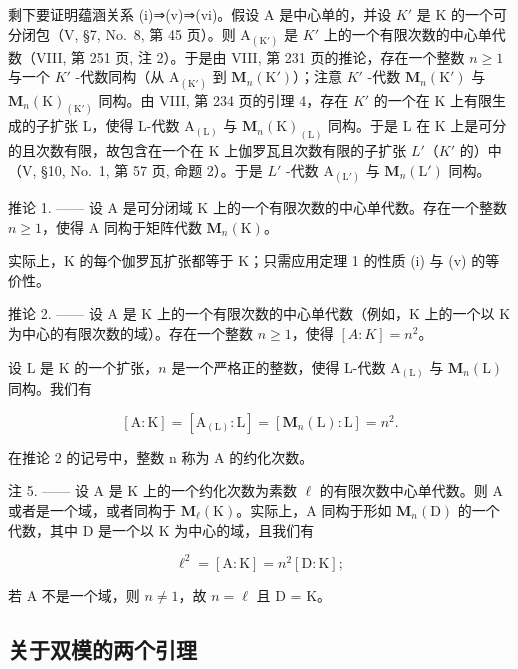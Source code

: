 剩下要证明蕴涵关系 (i)⇒(v)⇒(vi)。假设 A 是中心单的，并设 \(K'\) 是 K 的一个可分闭包（V, §7, No.~8, 第 45 页）。则 \(\mathrm{A}_{(\mathrm{K}')}\) 是 \(K'\) 上的一个有限次数的中心单代数（VIII, 第 251 页, 注 2）。于是由 VIII, 第 231 页的推论，存在一个整数 \(n \geqslant 1\) 与一个 \(K'\) -代数同构（从 \(\mathrm{A}_{(\mathrm{K}')}\) 到 \(\mathbf{M}_{n}(\mathrm{K}')\)）；注意 \(K'\) -代数 \(\mathbf{M}_{n}(\mathrm{K}')\) 与 \(\mathbf{M}_{n}(\mathrm{K})_{(\mathrm{K}')}\) 同构。由 VIII, 第 234 页的引理 4，存在 \(K'\) 的一个在 K 上有限生成的子扩张 L，使得 L-代数 \(\mathrm{A}_{(\mathrm{L})}\) 与 \(\mathbf{M}_{n}(\mathrm{K})_{(\mathrm{L})}\) 同构。于是 L 在 K 上是可分的且次数有限，故包含在一个在 K 上伽罗瓦且次数有限的子扩张 \(L'\)（\(K'\) 的）中（V, §10, No.~1, 第 57 页, 命题 2）。于是 \(L'\) -代数 \(\mathrm{A}_{(\mathrm{L}')}\) 与 \(\mathbf{M}_{n}(\mathrm{L}')\) 同构。

推论 1. —— 设 A 是可分闭域 K 上的一个有限次数的中心单代数。存在一个整数 \(n \geqslant 1\)，使得 A 同构于矩阵代数 \(\mathbf{M}_{n}(\mathrm{K})\)。

实际上，\(\mathrm{K}\) 的每个伽罗瓦扩张都等于 \(\mathrm{K}\)；只需应用定理 1 的性质 (i) 与 (v) 的等价性。

推论 2. —— 设 A 是 K 上的一个有限次数的中心单代数（例如，K 上的一个以 K 为中心的有限次数的域）。存在一个整数 \(n \geqslant 1\)，使得 \([A : K] = n^{2}\)。

设 \(\mathrm{L}\) 是 \(\mathrm{K}\) 的一个扩张，\(n\) 是一个严格正的整数，使得 L-代数 \(\mathrm{A}_{(\mathrm{L})}\) 与 \(\mathbf{M}_n(\mathrm{L})\) 同构。我们有

\[
[ \mathrm{A}: \mathrm{K} ] = [ \mathrm{A} _ {(\mathrm{L})}: \mathrm{L} ] = [ \mathbf {M} _ {n} (\mathrm{L}): \mathrm{L} ] = n ^ {2}.
\]

在推论 2 的记号中，整数 n 称为 A 的约化次数。

注 5. —— 设 A 是 K 上的一个约化次数为素数 \(\ell\) 的有限次数中心单代数。则 A 或者是一个域，或者同构于 \(\mathbf{M}_{\ell}(\mathrm{K})\)。实际上，A 同构于形如 \(\mathbf{M}_{n}(\mathrm{D})\) 的一个代数，其中 D 是一个以 K 为中心的域，且我们有

\[
\ell^ {2} = [ \mathrm{A}: \mathrm{K} ] = n ^ {2} [ \mathrm{D}: \mathrm{K} ];
\]

若 A 不是一个域，则 \(n \neq 1\)，故 \(n = \ell\) 且 D = K。

\subsection{关于双模的两个引理}

